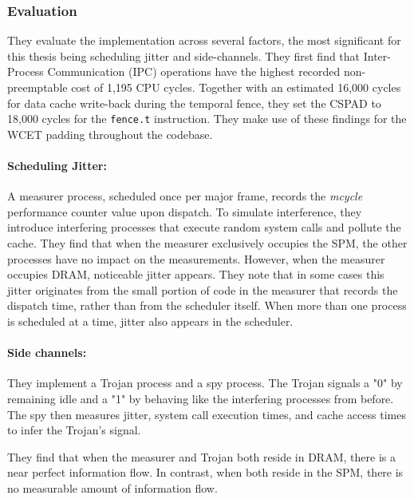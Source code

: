 \subsubsection{Evaluation}
They evaluate the implementation across several factors, the most significant
for this thesis being scheduling jitter and side-channels. They first find that
Inter-Process Communication (IPC) operations have the highest recorded
non-preemptable cost of 1,195 CPU cycles. Together with an estimated 16,000
cycles for data cache write-back during the temporal fence, they set the CSPAD
to 18,000 cycles for the \texttt{fence.t} instruction. They make use of these
findings for the WCET padding throughout the codebase.

\paragraph{Scheduling Jitter:} A measurer process, scheduled once per major
frame, records the \emph{mcycle} performance counter value upon dispatch. To
simulate interference, they introduce interfering processes that execute random
system calls and pollute the cache. They find that when the measurer exclusively
occupies the SPM, the other processes have no impact on the measurements.
However, when the measurer occupies DRAM, noticeable jitter appears. They note
that in some cases this jitter originates from the small portion of code in the
measurer that records the dispatch time, rather than from the scheduler itself.
When more than one process is scheduled at a time, jitter also appears in the
scheduler.

\paragraph{Side channels:} They implement a Trojan process and a spy process.
The Trojan signals a "0" by remaining idle and a "1" by behaving like the
interfering processes from before. The spy then measures jitter, system call
execution times, and cache access times to infer the Trojan's signal.

They find that when the measurer and Trojan both reside in DRAM, there is a
near perfect information flow. In contrast, when both reside in the SPM, there
is no measurable amount of information flow.
